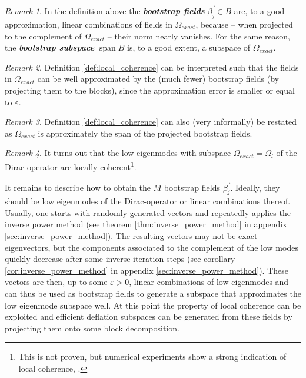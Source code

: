 \documentclass{article}
\DeclareMathOperator{\spn}{span} %
\theoremstyle{plain} %
\theoremstyle{convention} %
\theoremstyle{remark} %
\newtheorem*{remark}{Remark} %
\def\df#1{\textbf{\textit{#1}}}
\numberwithin{equation}{section}
\begin{document}
\begin{remark}
In the definition above the \df{bootstrap fields} $\vec{\beta_j} \in B$ are, to a good approximation, linear combinations of fields in $\Omega_{exact}$, because -- when projected to the complement of $\Omega_{exact}$ -- their norm nearly vanishes. For the same reason, the \df{bootstrap subspace} $\spn{B}$ is, to a good extent, a subspace of $\Omega_{exact}$.
\end{remark}

\begin{remark}
Definition \ref{def:local_coherence} can be interpreted such that the fields in $\Omega_{exact}$ can be well approximated by the (much fewer) bootstrap fields (by projecting them to the blocks), since the approximation error is smaller or equal to $\varepsilon$.
\end{remark}

\begin{remark}
Definition \ref{def:local_coherence} can also (very informally) be restated as $\Omega_{exact}$ is approximately the span of the projected bootstrap fields.
\end{remark}

\begin{remark}
It turns out that the low eigenmodes with subspace $\Omega_{exact} = \Omega_l$ of the Dirac-operator are locally coherent\footnote{This is not proven, but numerical experiments show a strong indication of local coherence, \cite{luscher2007}.}.
\end{remark}

It remains to describe how to obtain the $M$ bootstrap fields $\vec{\beta_j}$. Ideally, they should be low eigenmodes of the Dirac-operator or linear combinations thereof. Usually, one starts with randomly generated vectors and repeatedly applies the inverse power method (see theorem \ref{thm:inverse_power_method} in appendix \ref{sec:inverse_power_method}). The resulting vectors may not be exact eigenvectors, but the components associated to the complement of the low modes quickly decrease after some inverse iteration steps (see corollary \ref{cor:inverse_power_method} in appendix \ref{sec:inverse_power_method}). These vectors are then, up to some $\varepsilon > 0$, linear combinations of low eigenmodes and can thus be used as bootstrap fields to generate a subspace that approximates the low eigenmode subspace well. At this point the property of local coherence can be exploited and efficient deflation subspaces can be generated from these fields by projecting them onto some block decomposition.
\end{document}
